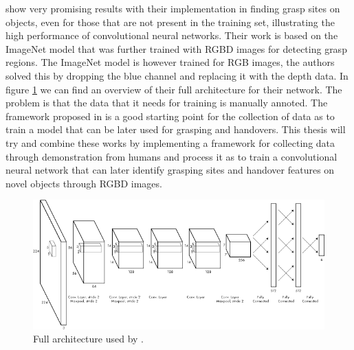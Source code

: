 \textcite{Redmon2014} show very promising results with their implementation in finding grasp sites on objects, even for those that are not present in the training set, illustrating the high performance of convolutional neural networks. Their work is based on the ImageNet model that was further trained with RGBD images for detecting grasp regions. The ImageNet model is however trained for RGB images, the authors solved this by dropping the blue channel and replacing it with the depth data. In figure \ref{fig:rel__cnn-arch} we can find an overview of their full architecture for their network. The problem is that the data that it needs for training is manually annoted. The framework proposed in \parencite{Chan2015a} is a good starting point for the collection of data as to train a model that can be later used for grasping and handovers. This thesis will try and combine these works by implementing a framework for collecting data through demonstration from humans and process it as to train a convolutional neural network that can later identify grasping sites and handover features on novel objects through RGBD images.

\begin{figure}
	\centering
	\includegraphics[width=\textwidth]{img/related-work/cnn-architecture.png}
	\caption{Full architecture used by \textcite{Redmon2014}.}
	\label{fig:rel__cnn-arch}
\end{figure}
